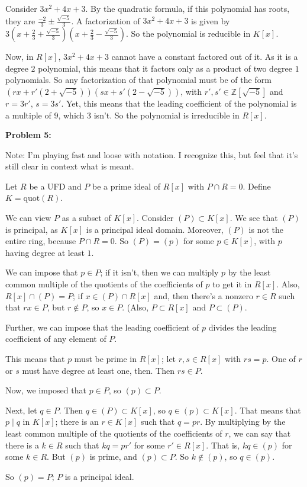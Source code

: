 \documentclass[a4paper,12pt]{article}
\newcommand{\shunt}{\vspace{20mm}}
\newcommand{\Z}{\mathbb{Z}}
\begin{document}
Consider $3x^2 + 4x + 3$. By the quadratic formula, if this polynomial has roots, they are $\frac{-2}{3} \pm \frac{\sqrt{-5}}{3}$. A factorization of $3x^2 + 4x + 3$ is given by $3(x+\frac{2}{3} + \frac{\sqrt{-5}}{3})(x+\frac{2}{3} - \frac{\sqrt{-5}}{3})$. So the polynomial is reducible in $K[x]$.

Now, in $R[x]$, $3x^2 + 4x + 3$ cannot have a constant factored out of it. As it is a degree $2$ polynomial, this means that it factors only as a product of two degree $1$ polynomials. So any factorization of that polynomial must be of the form $(rx+r'(2 +\sqrt{-5}))(sx+s'(2 -\sqrt{-5}))$, with $r',s' \in \Z[\sqrt{-5}]$ and $r=3r'$, $s=3s'$. Yet, this means that the leading coefficient of the polynomial is a multiple of $9$, which $3$ isn't. So the polynomial is irreducible in $R[x]$.

\shunt

{\bf Problem 5:} 

Note: I'm playing fast and loose with notation. I recognize this, but feel that it's still clear in context what is meant.

Let $R$ be a UFD and $P$ be a prime ideal of $R[x]$ with $P \cap R =0$. Define $K = \text{quot}(R)$.

We can view $P$ as a subset of $K[x]$. Consider $(P) \subset K[x]$. We see that $(P)$ is principal, as $K[x]$ is a principal ideal domain. Moreover, $(P)$ is not the entire ring, because $P \cap R = 0$. So $(P) = (p)$ for some $p \in K[x]$, with $p$ having degree at least $1$. %

We can impose that $p \in P$; if it isn't, then we can multiply $p$ by the least common multiple of the quotients of the coefficients of $p$ to get it in $R[x]$. Also, $R[x] \cap (P) = P$; if $x \in (P) \cap R[x]$ and, then there's a nonzero $r \in R$ such that $rx \in P$, but $r \notin P$, so $x \in P$. (Also, $P \subset R[x]$ and $P \subset (P)$.

Further, we can impose that the leading coefficient of $p$ divides the leading coefficient of any element of $P$.

This means that $p$ must be prime in $R[x]$; let $r,s \in R[x]$ with $rs = p$. One of $r$ or $s$ must have degree at least one, then. Then $rs \in P$. %

Now, we imposed that $p \in P$, so $(p) \subset P$.

Next, let $q \in P$. Then $q \in (P) \subset K[x]$, so $q \in (p) \subset K[x]$. That means that $p \mid q$ in $K[x]$; there is an $r \in K[x]$ such that $q=pr$. By multiplying by the least common multiple of the quotients of the coefficients of $r$, we can say that there is a $k \in R$ such that $kq=pr'$ for some $r' \in R[x]$. That is, $kq \in (p)$ for some $k \in R$. But $(p)$ is prime, and $(p) \subset P$. So $k \notin (p)$, so $q \in (p)$.

So $(p) = P$; $P$ is a principal ideal. 


\shunt
\end{document}
